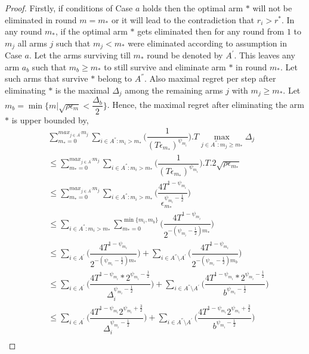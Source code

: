 \begin{proof}
	Firstly, if conditions of Case $a$ holds then the optimal arm ${*}$ will not be eliminated in round $m=m_{*}$ or it will lead to the contradiction that $r_{i}>r^{*}$. In any round $m_{*}$, if the optimal arm ${*}$ gets eliminated then for any round from $1$ to $m_{j}$ all arms ${j}$ such that $m_{j}< m_{*}$ were eliminated according to assumption in Case $a$. Let the arms surviving till $m_{*}$ round be denoted by $A^{'}$. This leaves any arm $a_{b}$ such that $m_{b}\geq m_{*}$ to still survive and eliminate arm ${*}$ in round $m_{*}$. Let such arms that survive ${*}$ belong to $A^{''}$. Also maximal regret per step after eliminating ${*}$ is the maximal $\Delta_{j}$ among the remaining arms ${j}$ with $m_{j}\geq m_{*}$.  Let $m_{b}=\min\lbrace m|\sqrt{\rho\epsilon_{m}}<\dfrac{\Delta_{b}}{2}\rbrace$. Hence, the maximal regret after eliminating the arm ${*}$ is upper bounded by, 
\begin{align*}
&\sum_{m_{*}=0}^{max_{j\in A^{'}}m_{j}}\sum_{i\in A^{''}:m_{i}>m_{*}}\bigg(\dfrac{1}{(  T\epsilon_{m_{*}})^{\psi_{m_i}}} \bigg).T\max_{j\in A^{''}:m_{j}\geq m_{*}}{\Delta}_{j}\\
&\leq\sum_{m_{*}=0}^{max_{j\in A^{'}}m_{j}}\sum_{i\in A^{''}:m_{i}>m_{*}}\bigg(\dfrac{1}{(  T\epsilon_{m_{*}})^{\psi_{m_i}}} \bigg).T.2\sqrt{\rho\epsilon_{m_{*}}}\\
&\leq\sum_{m_{*}=0}^{max_{j\in A^{'}}m_{j}}\sum_{i\in A^{''}:m_{i}>m_{*}}\bigg(\dfrac{4T^{1-\psi_{m_i}}}{\epsilon_{m_{*}}^{\psi_{m_i}-\frac{1}{2}}} \bigg)\\
&\leq\sum_{i\in A^{''}:m_{i}>m_{*}}\sum_{m_{*}=0}^{\min{\lbrace m_{i},m_{b}\rbrace}}\bigg(\dfrac{4T^{1-\psi_{m_i}}}{2^{-(\psi_{m_i}-\frac{1}{2})m_{*}}} \bigg)\\
&\leq\sum_{i\in A^{'}}\bigg(\dfrac{4T^{1-\psi_{m_i}}}{2^{-(\psi_{m_i}-\frac{1}{2})m_{*}}} \bigg)+\sum_{i\in A^{''}\setminus A^{'}}\bigg(\dfrac{4T^{1-\psi_{m_i}}}{2^{-(\psi_{m_i}-\frac{1}{2})m_{b}}} \bigg)\\
&\leq\sum_{i\in A^{'}}\bigg(\dfrac{4T^{1-\psi_{m_i}}*2^{\psi_{m_i}-\frac{1}{2}}}{\Delta_{i}^{\psi_{m_i}-\frac{1}{2}}} \bigg)+\sum_{i\in A^{''}\setminus A^{'}}\bigg(\dfrac{4T^{1-\psi_{m_i}}*2^{\psi_{m_i}-\frac{1}{2}}}{b^{\psi_{m_i}-\frac{1}{2}}} \bigg)\\
&\leq\sum_{i\in A^{'}}\bigg(\dfrac{4T^{1-\psi_{m_i}}2^{\psi_{m_i}+\frac{3}{2}}}{\Delta_{i}^{\psi_{m_i}-\frac{1}{2}}} \bigg)+\sum_{i\in A^{''}\setminus A^{'}}\bigg(\dfrac{4T^{1-\psi_{m_i}}2^{\psi_{m_i}+\frac{3}{2}}}{b^{\psi_{m_i}-\frac{1}{2}}} \bigg)\\
\end{align*}


\end{proof}
